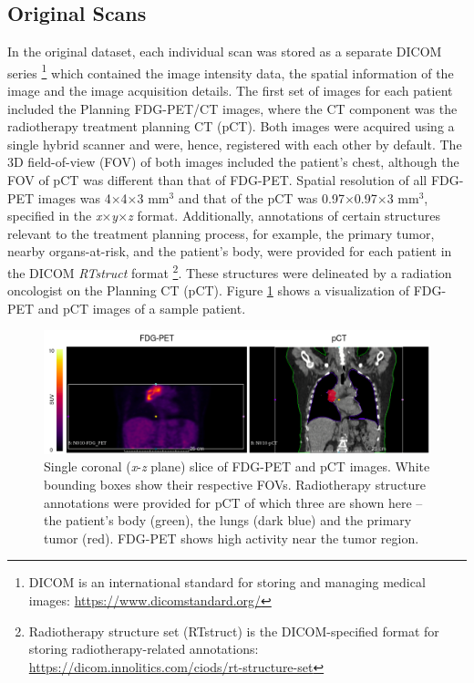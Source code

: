 \subsection{Original Scans}
\label{Original_Scans}
In the original dataset, each individual scan was stored as a separate DICOM series \footnote{DICOM is an international standard for storing and managing medical images: \url{https://www.dicomstandard.org/}} which contained the image intensity data, the spatial information of the image and the image acquisition details. The first set of images for each patient included the Planning FDG-PET/CT images, where the CT component was the radiotherapy treatment planning CT (pCT). Both images were acquired using a single hybrid scanner and were, hence, registered with each other by default. The 3D field-of-view (FOV) of both images included the patient's chest, although the FOV of pCT was different than that of FDG-PET. Spatial resolution of all FDG-PET images was 4$\times$4$\times$3 mm$^3$ and that of the pCT was 0.97$\times$0.97$\times$3 mm$^3$, specified in the \textit{x}$\times$\textit{y}$\times$\textit{z} format. Additionally, annotations of certain structures relevant to the treatment planning process, for example, the primary tumor, nearby organs-at-risk, and the patient's body, were provided for each patient in the DICOM \textit{RTstruct} format \footnote{Radiotherapy structure set (RTstruct) is the DICOM-specified format for storing radiotherapy-related annotations: \url{https://dicom.innolitics.com/ciods/rt-structure-set}}. These structures were delineated by a radiation oncologist on the Planning CT (pCT). Figure \ref{fig:original_fdgpet_pct} shows a visualization of FDG-PET and pCT images of a sample patient.

\begin{figure}[h!]
    \centering
    \includegraphics[width=\linewidth]{figures/Data/original/N010-FDG_PET_pCT.png}
    \caption{Single coronal (\textit{x}-\textit{z} plane) slice of FDG-PET and pCT images. White bounding boxes show their respective FOVs. Radiotherapy structure annotations were provided for pCT of which three are shown here -- the patient's body (green), the lungs (dark blue) and the primary tumor (red). FDG-PET shows high activity near the tumor region.}
    \label{fig:original_fdgpet_pct}
\end{figure}

